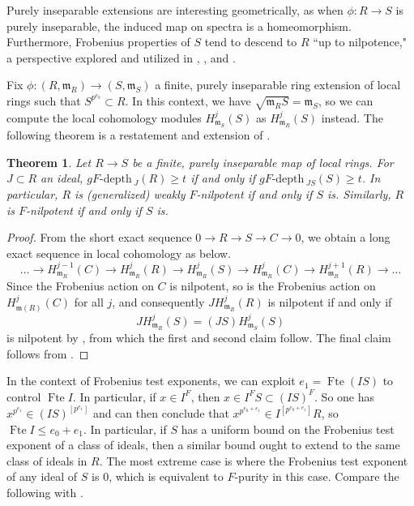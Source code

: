 \documentclass{amsproc}
\newtheorem{theorem}{Theorem}[section]
\theoremstyle{definition}
\theoremstyle{remark}
\numberwithin{equation}{section}
\newcommand{\fm}{\mathfrak{m}}
\newcommand{\fbp}[1]{\left[ #1 \right]}
\newcommand{\fte}{\operatorname{Fte}}
\newcommand{\gfdp}{gF\text{-depth}\,}
\begin{document}
Purely inseparable extensions are interesting geometrically, as when $\phi : R \rightarrow S$ is purely inseparable, the induced map on spectra is a homeomorphism. Furthermore, Frobenius properties of $S$ tend to descend to $R$ ``up to nilpotence," a perspective explored and utilized in \cite{DMP24}, \cite{MP23}, and \cite{MS25}. 

Fix $\phi \colon (R,\fm_R) \rightarrow (S,\fm_S)$ a finite, purely inseparable ring extension of local rings such that $S^{p^{e_0}} \subset R$. In this context, we have $\sqrt{\fm_R S} = \fm_S$, so we can compute the local cohomology modules $H^j_{\fm_S}(S)$ as $H^j_{\fm_R}(S)$ instead. The following theorem is a restatement and extension of \cite[Thm. 2.17]{DMP24}.

\begin{theorem} 
Let $R\rightarrow S$ be a finite, purely inseparable map of local rings. For $J\subset R$ an ideal, $\gfdp_J(R) \geq t$ if and only if $\gfdp_{JS}(S) \geq t$. In particular, $R$ is (generalized) weakly $F$-nilpotent if and only if $S$ is. Similarly, $R$ is $F$-nilpotent if and only if $S$ is.
\end{theorem}

\begin{proof}
From the short exact sequence $0 \to R\to S\to C \to 0$, we obtain a long exact sequence in local cohomology as below. \[ \ldots \to H^{j-1}_{\fm_R}(C) \to H^j_{\fm_R}(R) \to H^j_{\fm_R}(S) \to H^j_{\fm_R}(C) \to H^{j+1}_{\fm_R}(R) \to \ldots\] Since the Frobenius action on $C$ is nilpotent, so is the Frobenius action on $H^j_{\fm(R)}(C)$ for all $j$, and consequently $JH^j_{\fm_R}(R)$ is nilpotent if and only if \[JH^j_{\fm_R}(S)=(JS)H^j_{\fm_S}(S)\] is nilpotent by \cite[Thm. 3.5]{MM24}, from which the first and second claim follow. The final claim follows from \cite[Thm. 2.17]{DMP24}. 
\end{proof}


In the context of Frobenius test exponents, we can exploit $e_1=\fte(IS)$ to control $\fte I$. In particular, if $x \in I^F$, then $x \in I^FS \subset (IS)^F$. So one has $x^{p^{e_1}} \in (IS)^{\fbp{p^{e_1}}}$ and can then conclude that $x^{p^{e_0+e_1}} \in I^{\fbp{p^{e_0+e_1}}}R$, so $\fte I \le e_0+e_1$. In particular, if $S$ has a uniform bound on the Frobenius test exponent of a class of ideals, then a similar bound ought to extend to the same class of ideals in $R$. The most extreme case is where the Frobenius test exponent of any ideal of $S$ is $0$, which is equivalent to $F$-purity in this case. Compare the following with \cite[Thm. 4.4 and Rmk. 4.5]{DMP24}.
\end{document}
